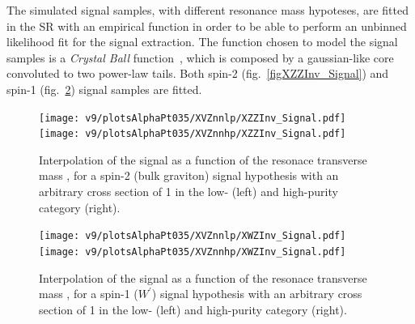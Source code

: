 The simulated signal samples, with different resonance mass hypoteses, are fitted in the SR with an empirical function in order to be able to perform an unbinned likelihood fit for the signal extraction. The function chosen to model the signal samples is a \emph{Crystal Ball} function~\cite{Oreglia:1980cs,Skwarnicki:1986xj}, which is composed by a gaussian-like core convoluted to two power-law tails. %
Both spin-2 (fig.~\ref{figXZZInv_Signal}) and spin-1 (fig.~\ref{fig:XWZInv_Signal}) signal samples are fitted.

\begin{figure}[!htb]
  \centering
    \texttt{[image: v9/plotsAlphaPt035/XVZnnlp/XZZInv\_Signal.pdf]}
    \texttt{[image: v9/plotsAlphaPt035/XVZnnhp/XZZInv\_Signal.pdf]}
  \caption{Interpolation of the signal as a function of the resonace transverse mass \mtVZ, for a spin-2 (bulk graviton) signal hypothesis with an arbitrary cross section of 1 \pb in the low- (left) and high-purity category (right).}
  \label{fig:XZZInv_Signal}
\end{figure}

\begin{figure}[!htb]
  \centering
    \texttt{[image: v9/plotsAlphaPt035/XVZnnlp/XWZInv\_Signal.pdf]}
    \texttt{[image: v9/plotsAlphaPt035/XVZnnhp/XWZInv\_Signal.pdf]}
  \caption{Interpolation of the signal as a function of the resonace transverse mass \mtVZ, for a spin-1 ($W^{'}$) signal hypothesis with an arbitrary cross section of 1 \pb in the low- (left) and high-purity category (right).}
  \label{fig:XWZInv_Signal}
\end{figure}



